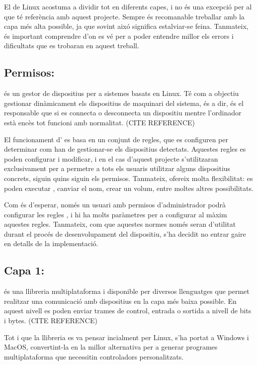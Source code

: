 El  de Linux acostuma a dividir tot en diferents capes, i no és una
excepció per al que té referència amb aquest projecte. Sempre és recomanable
treballar amb la capa més alta possible, ja que sovint aixó significa
estalviar-se feina. Tanmateix, és important comprendre d'on es vé per a
poder entendre millor els errors i dificultats que es trobaran en aquest treball.

\subsection{Permisos: }

 és un gestor de dispositius per a sistemes basats en Linux.
Té com a objectiu gestionar dinàmicament els dispositius de maquinari del
sistema, és a dir, és el responsable que si es connecta o desconnecta
un dispositiu mentre l'ordinador està encès tot funcioni amb normalitat.
(CITE REFERENCE)

El funcionament d' es basa en un conjunt de regles,
que es configuren per
determinar com han de gestionar-se els dispositius detectats.
Aquestes regles es poden configurar i modificar, i en el cas d'aquest projecte
s'utilitzaran exclusivament per a permetre a tots els usuaris utilitzar alguns
dispositius concrets, siguin quins siguin els permisos. Tanmateix, 
ofereix molta flexibilitat: es poden executar , canviar el nom,
crear un volum, entre moltes altres possibilitats.

Com és d'esperar, només un usuari amb permisos d'administrador podrà configurar
les regles , i hi ha molts paràmetres per a configurar al màxim
aquestes regles. Tanmateix, com que aquestes normes només seran d'utilitat durant
el procés de desenvolupament del dispositiu, s'ha decidit no entrar gaire en
detalls de la implementació.

\subsection{Capa 1: }

 és una llibreria multiplataforma i disponible per diversos
llenguatges que permet realitzar una comunicació amb dispositius  en
la capa més baixa possible. En aquest nivell es poden enviar trames de control,
entrada o sortida a nivell de bits i bytes. (CITE REFERENCE)

Tot i que la llibreria es va pensar
incialment per Linux, s'ha portat a Windows i MacOS, convertint-la en la millor
alternativa per a generar programes multiplataforma que necessitin controladors
personalitzats.


